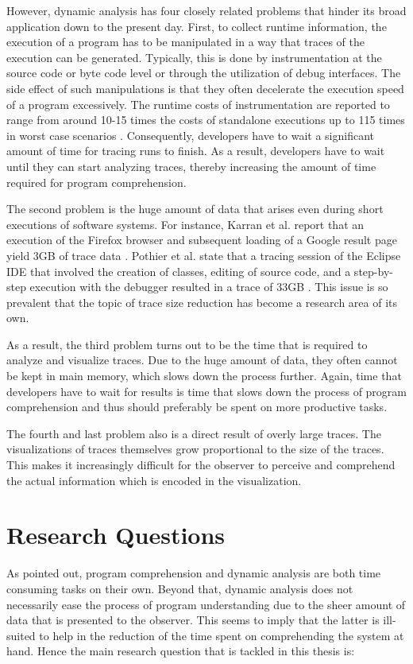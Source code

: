 However, dynamic analysis has four closely related problems that hinder its broad application down to the present day.
First, to collect runtime information, the execution of a program has to be manipulated in a way that traces of the execution can be generated.
Typically, this is done by instrumentation at the source code or byte code level or through the utilization of debug interfaces.
The side effect of such manipulations is that they often decelerate the execution speed of a program excessively.
The runtime costs of instrumentation are reported to range from around 10-15 times the costs of standalone executions up to 115 times in worst case scenarios \cite{pothier_scalable_2007, karran_synctrace:_2013}.
Consequently, developers have to wait a significant amount of time for tracing runs to finish.
As a result, developers have to wait until they can start analyzing traces, thereby increasing the amount of time required for program comprehension.

The second problem is the huge amount of data that arises even during short executions of software systems.
For instance, Karran et al. report that an execution of the Firefox browser and subsequent loading of a Google result page yield 3GB of trace data \cite{karran_synctrace:_2013}.
Pothier et al. state that a tracing session of the Eclipse IDE that involved the creation of classes, editing of source code, and a step-by-step execution with the debugger resulted in a trace of 33GB \cite{pothier_scalable_2007}.
This issue is so prevalent that the topic of trace size reduction has become a research area of its own.

As a result, the third problem turns out to be the time that is required to analyze and visualize traces.
Due to the huge amount of data, they often cannot be kept in main memory, which slows down the process further.
Again, time that developers have to wait for results is time that slows down the process of program comprehension and thus should preferably be spent on more productive tasks.

The fourth and last problem also is a direct result of overly large traces.
The visualizations of traces themselves grow proportional to the size of the traces.
This makes it increasingly difficult for the observer to perceive and comprehend the actual information which is encoded in the visualization.

\section{Research Questions}
As pointed out, program comprehension and dynamic analysis are both time consuming tasks on their own.
Beyond that, dynamic analysis does not necessarily ease the process of program understanding due to the sheer amount of data that is presented to the observer.
This seems to imply that the latter is ill-suited to help in the reduction of the time spent on comprehending the system at hand.
Hence the main research question that is tackled in this thesis is:

